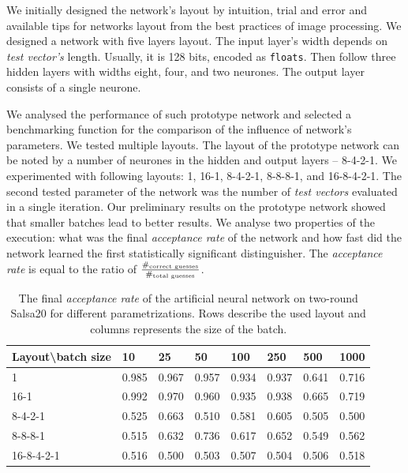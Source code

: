 \documentclass[
    digital,    %
    oneside,    %
    color,
    11pt,
    nocover,
    notable,
    nolof,
    nolot,
]{fithesis3}
\begin{document}
We initially designed the network's layout by intuition, trial and error and available tips for networks layout from the best practices of image processing. We designed a network with five layers layout. The input layer's width depends on \textit{test vector's} length. Usually, it is 128 bits, encoded as \texttt{floats}. Then follow three hidden layers with widths eight, four, and two neurones. The output layer consists of a single neurone.

We analysed the performance of such prototype network and selected a benchmarking function for the comparison of the influence of network's parameters. We tested multiple layouts. The layout of the prototype network can be noted by a number of neurones in the hidden and output layers -- 8-4-2-1. We experimented with following layouts: 1, 16-1, 8-4-2-1, 8-8-8-1, and 16-8-4-2-1. The second tested parameter of the network was the number of \textit{test vectors} evaluated in a single iteration. Our preliminary results on the prototype network showed that smaller batches lead to better results. We analyse two properties of the execution: what was the final \textit{acceptance rate} of the network and how fast did the network learned the first statistically significant distinguisher. The \textit{acceptance rate} is equal to the ratio of $\frac{\#_{\textnormal{correct guesses}}}{\#_{\textnormal{total guesses}}}$.

\begin{table}[b]
\centering
\begin{tabular}{l|l l l l l l l}
\textbf{\large Layout\textbackslash{}batch size} & \textbf{\large 10} & \textbf{\large 25} & \textbf{\large 50} & \textbf{\large 100} & \textbf{\large 250} & \textbf{\large 500} & \textbf{\large 1000}\\ \hline
1          & 0.985 & 0.967 & 0.957 & 0.934 & 0.937 & 0.641 & 0.716 \\
16-1       & 0.992 & 0.970 & 0.960 & 0.935 & 0.938 & 0.665 & 0.719 \\
8-4-2-1    & 0.525 & 0.663 & 0.510 & 0.581 & 0.605 & 0.505 & 0.500 \\
8-8-8-1    & 0.515 & 0.632 & 0.736 & 0.617 & 0.652 & 0.549 & 0.562 \\
16-8-4-2-1 & 0.516 & 0.500 & 0.503 & 0.507 & 0.504 & 0.506 & 0.518  
\end{tabular}
\caption{The final \textit{acceptance rate} of the artificial neural network on two-round Salsa20 for different parametrizations. Rows describe the used layout and columns represents the size of the batch.}
\label{table:res-ann-acc}
\end{table}
\end{document}
